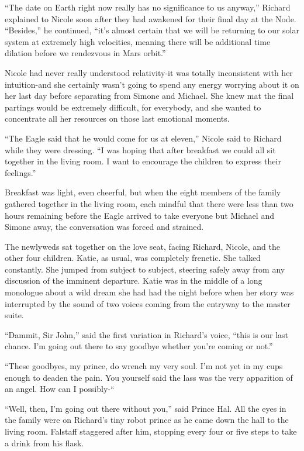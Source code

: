\documentclass[]{article}
\begin{document}
{“The date on Earth right now really has no significance to us anyway,” Richard explained to Nicole soon after they had awakened for their final day at the Node. “Besides,” he continued, “it’s almost certain that we will be returning to our solar system at extremely high velocities, meaning there will be additional time dilation before we rendezvous in Mars orbit.”

Nicole had never really understood relativity-it was totally inconsistent with her intuition-and she certainly wasn’t going to spend any energy worrying about it on her last day before separating from Simone and Michael. She knew mat the final partings would be extremely difficult, for everybody, and she wanted to concentrate all her resources on those last emotional moments.

“The Eagle said that he would come for us at eleven,” Nicole said to Richard while they were dressing. “I was hoping that after breakfast we could all sit together in the living room. I want to encourage the children to express their feelings.”

Breakfast was light, even cheerful, but when the eight members of the family gathered together in the living room, each mindful that there were less than two hours remaining before the Eagle arrived to take everyone but Michael and Simone away, the conversation was forced and strained.

The newlyweds sat together on the love seat, facing Richard, Nicole, and the other four children. Katie, as usual, was completely frenetic. She talked constantly. She jumped from subject to subject, steering safely away from any discussion of the imminent departure. Katie was in the middle of a long monologue about a wild dream she had had the night before when her story was interrupted by the sound of two voices coming from the entryway to the master suite.

“Dammit, Sir John,” said the first variation in Richard’s voice, “this is our last chance. I’m going out there to say goodbye whether you’re coming or not.”

“These goodbyes, my prince, do wrench my very soul. I’m not yet in my cups enough to deaden the pain. You yourself said the lass was the very apparition of an angel. How can I possibly-“

“Well, then, I’m going out there without you,” said Prince Hal. All the eyes in the family were on Richard’s tiny robot prince as he came down the hall to the living room. Falstaff staggered after him, stopping every four or five steps to take a drink from his flask.

}
\end{document}
